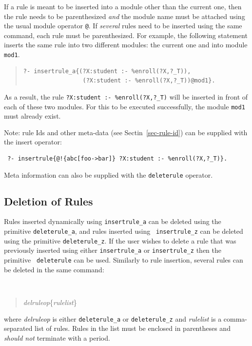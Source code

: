 \documentclass[11pt]{article}
\begin{document}
If a rule is meant to be inserted into a module other than the current one,
then the rule needs to be parenthesized \emph{and} the module name must be
attached using the usual module operator {\tt @}. If \emph{several} rules
need to be inserted using the same command, each rule must be
parenthesized.  For example, the following statement inserts the same rule
into two different modules: the current one and into module {\tt mod1}.
\begin{quote}
\begin{verbatim}
?- insertrule_a{(?X:student :- %enroll(?X,?_T)),
                 (?X:student :- %enroll(?X,?_T))@mod1}.
\end{verbatim}
\end{quote}
As a result, the rule {\tt ?X:student :- \verb|%|enroll(?X,?\_T)} will be
inserted in front of each of these two modules.  For this to be executed
successfully, the module {\tt mod1} must already exist.

Note: rule Ids and other meta-data (see Sectin~\ref{sec-rule-id})
can be supplied with the insert operator: 
\begin{verbatim}
 ?- insertrule{@!{abc[foo->bar]} ?X:student :- %enroll(?X,?_T)}.
\end{verbatim}
Meta information can also be supplied with the \texttt{deleterule}
operator. 


\subsection{Deletion of Rules}
\label{sec-deletingrule}

Rules inserted dynamically using {\tt insertrule\_a} can be deleted using
the primitive {\tt deleterule\_a}, and rules inserted using {\tt
  insertrule\_z} can be deleted using the primitive {\tt deleterule\_z}. If
the user wishes to delete a rule that was previously inserted using either
{\tt insertrule\_a} or {\tt insertrule\_z} then the primitive {\tt
  deleterule} can be used. Similarly to rule insertion, several rules can be
deleted in the same command:
{\tt
\begin{quote}
\emph{delruleop}\{\emph{rulelist}\}
\end{quote}
}
\noindent
where \emph{delruleop} is either {\tt deleterule\_a} or {\tt deleterule\_z}
and \emph{rulelist} is a comma-separated list of rules. Rules in the list
must be enclosed in parentheses and \emph{should not} terminate with a
period.
\end{document}
